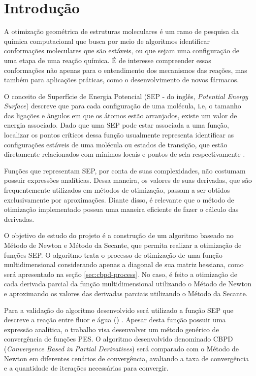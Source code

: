 \section{Introdução}

A otimização geométrica de estruturas moleculares é um ramo de pesquisa da química
computacional que busca por meio de algoritmos identificar conformações moleculares que
são estáveis, ou que sejam uma configuração de uma etapa de uma reação química. É de interesse compreender essas conformações não apenas para o entendimento dos mecanismos das reações, mas também para aplicações práticas, como o desenvolvimento de novos fármacos.

O conceito de Superfície de Energia Potencial (SEP - do inglês, \textit{Potential Energy Surface}) descreve que para cada configuração de uma molécula, i.e, o tamanho das ligações e ângulos em que os átomos estão arranjados, existe um valor de energia associado. Dado que uma SEP pode estar associada a uma função, localizar os pontos críticos dessa função usualmente representa identificar as configurações estáveis de uma molécula ou estados de transição, que estão diretamente relacionados com mínimos locais e pontos de sela respectivamente \cite{geometry_optimization}.

Funções que representam SEP, por conta de suas complexidades, não costumam possuir expressões analíticas. Dessa maneira, os valores de suas derivadas, que são frequentemente utilizados em métodos de otimização, passam a ser obtidos  exclusivamente por aproximações. Diante disso, é relevante que o método de otimização implementado possua uma maneira eficiente de fazer o cálculo das derivadas. 

O objetivo de estudo do projeto é a construção de um algoritmo baseado no Método de Newton e Método da Secante, que permita realizar a otimização de funções SEP. O algoritmo trata o processo de otimização de uma função multidimensional considerando apenas a diagonal de sua matriz hessiana, como será apresentado na seção \ref{sec:cbpd-process}. No caso, é feito a otimização de cada derivada parcial da função multidimensional utilizando o Método de Newton e aproximando os valores das derivadas parciais utilizando o Método da Secante.

Para a validação do algoritmo desenvolvido será utilizado a função SEP que descreve a reação entre fluor e água () \cite{fh2o_first_sep}. Apesar desta função possuir uma expressão analítica, o trabalho visa desenvolver um método genérico de convergência de funções PES. O algoritmo desenvolvido denominado CBPD (\textit{Convergence Based in Partial Derivatives}) será comparado com o Método de Newton em diferentes cenários de convergência, avaliando a taxa de convergência e a quantidade de iterações necessárias para convergir.

